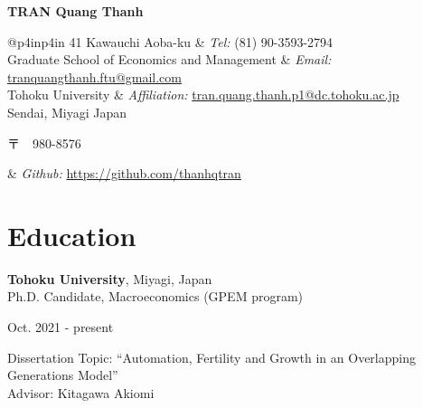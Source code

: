 \documentclass[a4paper,20pt]{article}
\newcommand\textjp[1]{%
	\begin{CJK}{UTF8}{min}#1\end{CJK}}
\begin{document}
	
	
	\begin{center}
		\textbf{{\LARGE \color{black} TRAN Quang Thanh}}
	\end{center}
	
	\hrulefill
	\vspace{2pt}
	
	\begin{tabular}{@{}p{4in}p{4in}}
		41 Kawauchi Aoba-ku                          & {\it Tel:}  (81) 90-3593-2794                                                                              \\            
		Graduate School of Economics and Management  & {\it Email:}  \href{mailto:tranquangthanh.ftu@gmail.com}{tranquangthanh.ftu@gmail.com}                     \\         
		Tohoku University                            & {\it Affiliation:}  \href{mailto:tran.quang.thanh.p1@dc.tohoku.ac.jp}{tran.quang.thanh.p1@dc.tohoku.ac.jp} \\       
		Sendai, Miyagi Japan \textjp{〒　980-8576} & {\it Github:} \href{https://github.com/thanhqtran}{https://github.com/thanhqtran}                          \\     
	\end{tabular}
	
	\vspace{4pt}
	
	
	\section{Education}
	\begin{minipage}{.7\linewidth} \begin{flushleft}
			\textbf{Tohoku University}, Miyagi, Japan \\
			\hspace{4mm} Ph.D. Candidate, Macroeconomics (GPEM program)
	\end{flushleft} \end{minipage}
	\hfill 
	\begin{minipage}{.25\linewidth}\begin{flushright}
			Oct. 2021 - present \\
			
	\end{flushright}\end{minipage}
	
	\vspace{2pt}
	\hspace{4mm} Dissertation Topic:  ``Automation, Fertility and Growth in an Overlapping Generations Model'' \\
	\hspace{4mm} Advisor:  Kitagawa Akiomi
	\vspace{2pt}
	
\end{document}
